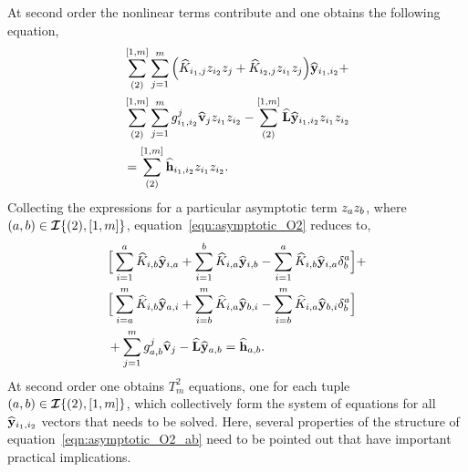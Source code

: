 At second order the nonlinear terms contribute and one obtains the following equation,
\begin{align}
	\label{eqn:asymptotic_O2}
	\begin{split}
		& \sum^{[1,m]}_{(2)}\sum^{m}_{j=1}\Big( \widehat{K}_{i_{1},j}z_{i_{2}}z_{j} + \widehat{K}_{i_{2},j}z_{i_{1}}z_{j} \Big)\widehat{\mathbf{y}}_{i_{1},i_{2}} + \\
		& \sum^{[1,m]}_{(2)} \sum^{m}_{j=1}g^{j}_{i_{1},i_{2}}\widehat{\mathbf{v}}_{j}z_{i_{1}}z_{i_{2}} - \sum^{[1,m]}_{(2)} \mathbf{\widehat{L}}\widehat{\mathbf{y}}_{i_{1},i_{2}}z_{i_{1}}z_{i_{2}} \\ 
		& = \sum^{[1,m]}_{(2)} \widehat{\mathbf{h}}_{i_{1},i_{2}}z_{i_{1}}z_{i_{2}}.
	\end{split} 
\end{align}
Collecting the expressions for a particular asymptotic term $z_{a}z_{b}$, where $(a,b)\in\bm{\mathcal{I}}\{(2),[1,m]\}$, equation~\eqref{eqn:asymptotic_O2} reduces to,
\begin{equation}
	\label{eqn:asymptotic_O2_ab}
	\begin{split}
		& \Big[ \sum^{a}_{i=1}\widehat{K}_{i,b}\widehat{\mathbf{y}}_{i,a} +
		\sum^{b}_{i=1}\widehat{K}_{i,a}\widehat{\mathbf{y}}_{i,b} - \sum^{a}_{i=1}\widehat{K}_{i,b}\widehat{\mathbf{y}}_{i,a}\delta^{a}_{b} \Big] + \\
		& \Big[
		 \sum^{m}_{i=a}\widehat{K}_{i,b}\widehat{\mathbf{y}}_{a,i} +
		 \sum^{m}_{i=b}\widehat{K}_{i,a}\widehat{\mathbf{y}}_{b,i}  - 
		 \sum^{m}_{i=b}\widehat{K}_{i,a}\widehat{\mathbf{y}}_{b,i}\delta^{a}_{b}\Big] 
		   \\
		& + \sum^{m}_{j=1}g^{j}_{a,b}\widehat{\mathbf{v}}_{j} - \mathbf{\widehat{L}}\widehat{\mathbf{y}}_{a,b} = \widehat{\mathbf{h}}_{a,b}.
	\end{split}
\end{equation}
At second order one obtains $T^{2}_{m}$ equations, one for each tuple $(a,b)\in\bm{\mathcal{I}}\{(2),[1,m]\}$, which collectively form the system of equations for all $\widehat{\mathbf{y}}_{i_{1},i_{2}}$ vectors that needs to be solved. Here, several properties of the structure of equation~\eqref{eqn:asymptotic_O2_ab} need to be pointed out that have important practical implications. 

